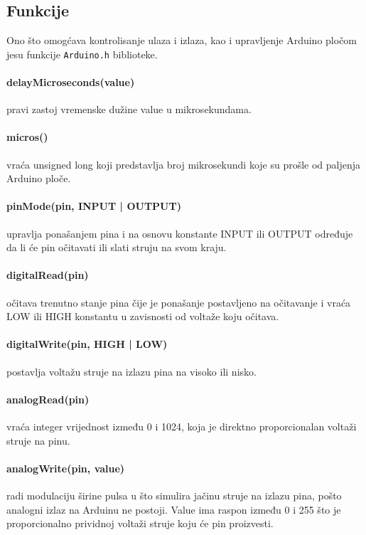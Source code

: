 \documentclass[../Document.tex]{subfiles}
\begin{document}
\subsection{Funkcije}\label{funkcije}

Ono što omogćava kontrolisanje ulaza i izlaza, kao i upravljenje Arduino pločom jesu funkcije \verb|Arduino.h| biblioteke.

\paragraph{delayMicroseconds(value)} pravi zastoj vremenske dužine value u mikrosekundama.

\paragraph{micros()} vraća unsigned long koji predstavlja broj mikrosekundi koje su prošle od paljenja Arduino ploče.

\paragraph{pinMode(pin, INPUT | OUTPUT)} upravlja ponašanjem pina i na osnovu konstante INPUT ili OUTPUT određuje da li će pin očitavati ili slati struju na svom kraju.

\paragraph{digitalRead(pin)} očitava trenutno stanje pina čije je ponašanje postavljeno na očitavanje i vraća LOW ili HIGH konstantu u zavisnosti od voltaže koju očitava.

\paragraph{digitalWrite(pin, HIGH | LOW)} postavlja voltažu struje na izlazu pina na visoko ili nisko.

\paragraph{analogRead(pin)} vraća integer vrijednost između 0 i 1024, koja je direktno proporcionalan voltaži struje na pinu.

\paragraph{analogWrite(pin, value)} radi modulaciju širine pulsa u što simulira jačinu struje na izlazu pina, pošto analogni izlaz na Arduinu ne postoji. Value ima raspon između 0 i 255 što je proporcionalno prividnoj voltaži struje koju će pin proizvesti.
\end{document}
